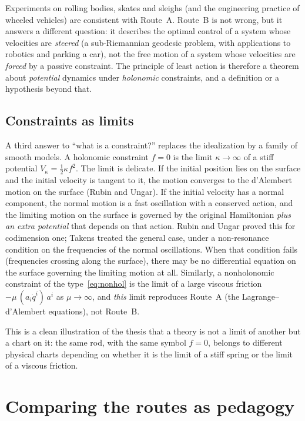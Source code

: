 Experiments on rolling bodies, skates and sleighs (and the engineering
practice of wheeled vehicles) are consistent with Route~A. Route~B is not
wrong, but it answers a different question: it describes the optimal control
of a system whose velocities are \emph{steered} (a sub-Riemannian
geodesic problem, with applications to robotics and parking a car), not the
free motion of a system whose velocities are \emph{forced} by a passive
constraint. The principle of least action is therefore a theorem about
\emph{potential} dynamics under \emph{holonomic} constraints, and a
definition or a hypothesis beyond that.

\subsection{Constraints as limits}
\label{sec:constraints-limits}

A third answer to ``what is a constraint?'' replaces the idealization by a
family of smooth models. A holonomic constraint $f=0$ is the limit
$\kappa\to\infty$ of a stiff potential $V_\kappa=\tfrac12\kappa f^2$. The limit
is delicate. If the initial position lies on the surface and the initial
velocity is tangent to it, the motion converges to the d'Alembert motion on the
surface (Rubin and Ungar). If the initial velocity has a normal component, the
normal motion is a fast oscillation with a conserved action, and the limiting
motion on the surface is governed by the original Hamiltonian \emph{plus an
extra potential} that depends on that action. Rubin and Ungar proved this for
codimension one; Takens treated the general case, under a non-resonance
condition on the frequencies of the normal oscillations. When that condition
fails (frequencies crossing along the surface), there may be no differential
equation on the surface governing the limiting motion at all.
Similarly, a nonholonomic constraint of the type~\eqref{eq:nonhol} is
the limit of a large viscous friction $-\mu\,(a_i\dot q^i)\,a^i$ as
$\mu\to\infty$, and \emph{this} limit reproduces Route~A (the
Lagrange--d'Alembert equations), not Route~B.

This is a clean illustration of the thesis that a theory is not a limit of
another but a chart on it: the same rod, with the same symbol $f=0$, belongs
to different physical charts depending on whether it is the limit of a stiff
spring or the limit of a viscous friction.

\section{Comparing the routes as pedagogy}
\label{sec:pedagogy}

